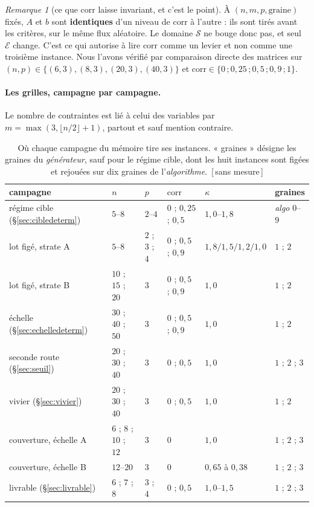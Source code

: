 \documentclass[11pt,a4paper]{article}
\theoremstyle{plain}
\theoremstyle{remark}
\newtheorem{remark}{Remarque}
\newcommand{\Ecal}{\mathcal{E}}
\newcommand{\Scal}{\mathcal{S}}
\newcommand{\confna}{\textsf{\footnotesize[\,sans mesure\,]}}
\begin{document}
\begin{remark}[ce que $\text{corr}$ laisse invariant, et c'est le point]
À $(n,m,p,\text{graine})$ fixés, $A$ et $b$ sont \textbf{identiques} d'un
niveau de $\text{corr}$ à l'autre : ils sont tirés avant les critères, sur
le même flux aléatoire. Le domaine $\Scal$ ne bouge donc pas, et seul
$\Ecal$ change. C'est ce qui autorise à lire $\text{corr}$ comme un levier
et non comme une troisième instance. Nous l'avons vérifié par comparaison
directe des matrices sur $(n,p)\in\{(6,3),(8,3),(20,3),(40,3)\}$ et
$\text{corr}\in\{0\,;0{,}25\,;0{,}5\,;0{,}9\,;1\}$.
\end{remark}

\paragraph{Les grilles, campagne par campagne.} Le nombre de contraintes
est lié à celui des variables par $m=\max(3,\lfloor n/2\rfloor+1)$, partout
et sauf mention contraire.

\begin{table}[H]
\centering
\caption{Où chaque campagne du mémoire tire ses instances. « graines »
désigne les graines du \emph{générateur}, sauf pour le régime cible, dont
les huit instances sont figées et rejouées sur dix graines de
l'\emph{algorithme}.\ \confna}
\label{tab:grilles}
\setlength{\tabcolsep}{4pt}\small
\begin{tabular}{llllll}
\toprule
campagne & $n$ & $p$ & $\text{corr}$ & $\kappa$ & graines\\
\midrule
régime cible (\S\ref{sec:cibledeterm})
 & $5$--$8$ & $2$--$4$ & $0$ ; $0{,}25$ ; $0{,}5$ & $1{,}0$--$1{,}8$
 & \emph{algo} $0$--$9$\\
lot figé, strate A
 & $5$--$8$ & $2$ ; $3$ ; $4$ & $0$ ; $0{,}5$ ; $0{,}9$
 & $1{,}8/1{,}5/1{,}2/1{,}0$ & $1$ ; $2$\\
lot figé, strate B
 & $10$ ; $15$ ; $20$ & $3$ & $0$ ; $0{,}5$ ; $0{,}9$ & $1{,}0$ & $1$ ; $2$\\
échelle (\S\ref{sec:echelledeterm})
 & $30$ ; $40$ ; $50$ & $3$ & $0$ ; $0{,}5$ ; $0{,}9$ & $1{,}0$ & $1$ ; $2$\\
seconde route (\S\ref{sec:seuil})
 & $20$ ; $30$ ; $40$ & $3$ & $0$ ; $0{,}5$ & $1{,}0$ & $1$ ; $2$ ; $3$\\
vivier (\S\ref{sec:vivier})
 & $20$ ; $30$ ; $40$ & $3$ & $0$ ; $0{,}5$ & $1{,}0$ & $1$ ; $2$\\
couverture, échelle A
 & $6$ ; $8$ ; $10$ ; $12$ & $3$ & $0$ & $1{,}0$ & $1$ ; $2$ ; $3$\\
couverture, échelle B
 & $12$--$20$ & $3$ & $0$
 & $0{,}65$ à $0{,}38$ & $1$ ; $2$ ; $3$\\
livrable (\S\ref{sec:livrable})
 & $6$ ; $7$ ; $8$ & $3$ ; $4$ & $0$ ; $0{,}5$ & $1{,}0$--$1{,}5$ & $1$ ; $2$ ; $3$\\
\bottomrule
\end{tabular}
\end{table}
\end{document}
